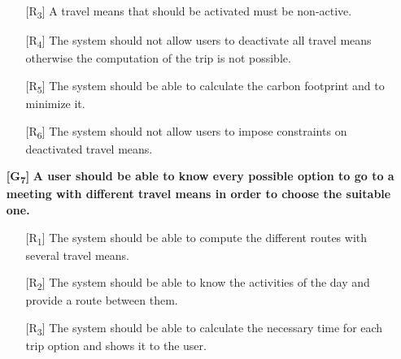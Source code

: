 \documentclass[12pt,titlepage]{article}
\begin{document}
\begin{itemize}
\begin{itemize}
\item[{[R\textsubscript{3}]}] A travel means that should be activated must be non-active.
\item[{[R\textsubscript{4}]}]  The system should not allow users to deactivate all travel means otherwise the computation of the trip is not possible.
\item[{[R\textsubscript{5}]}]  The system should be able to calculate the carbon footprint and to minimize it.
\item[{[R\textsubscript{6}]}]  The system should not allow users to impose constraints on deactivated travel means.
\end{itemize}

\item[\textbf{ {[G\textsubscript{7}]}}]	\textbf{	A user should be able to know every possible option to go to a meeting with different travel means in order to choose the suitable one.}
\begin{itemize}
\item[{[R\textsubscript{1}]}]  The system should be able to compute the different routes with several travel means.
\item[{[R\textsubscript{2}]}] The system should be able to know the activities of the day and provide a route between them.
\item[{[R\textsubscript{3}]}] The system should be able to calculate the necessary time for each trip option and shows it to the user.
\end{itemize}


\end{itemize}
\end{document}
